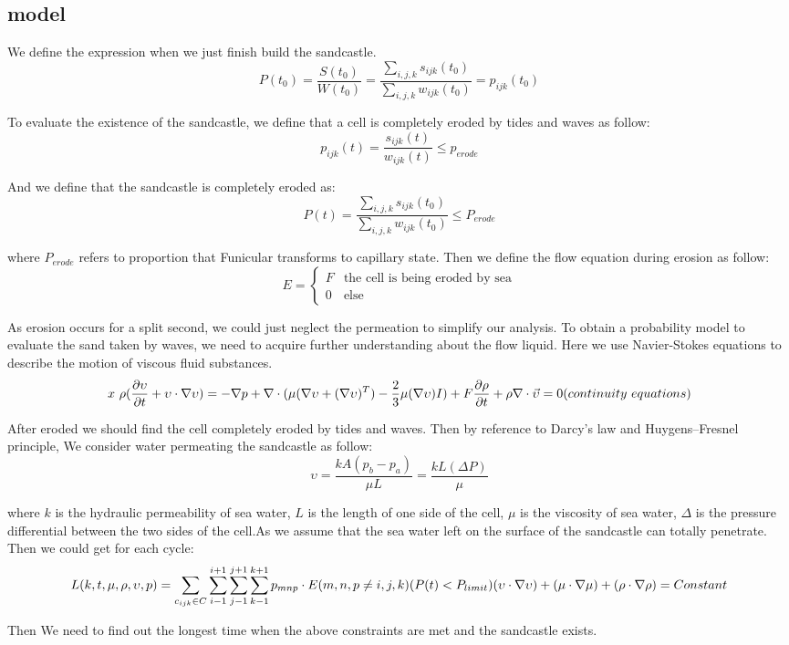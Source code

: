 \documentclass[12pt]{article}
\begin{document}
\subsection{model}
We define the expression when we just finish build the sandcastle.
$$  P(t_0) = \frac{S(t_0)}{W(t_0)} = \frac{\sum_{i,j,k}s_{ijk}(t_0)}{\sum_{i,j,k}w_{ijk}(t_0)} = p_{ijk}(t_0) $$
\par
To evaluate the existence of the sandcastle, we define that a cell is completely eroded by tides and waves as follow:
$$  p_{ijk}(t) = \frac{s_{ijk}(t)}{w_{ijk}(t)} \leq p_{erode} $$
\par
And we define that the sandcastle is completely eroded as:
$$  P(t) = \frac{\sum_{i,j,k}s_{ijk}(t_0)}{\sum_{i,j,k}w_{ijk}(t_0)} \leq P_{erode} $$
\par
where $P_{erode}$ refers to proportion that Funicular transforms to capillary state. Then we define the flow equation during erosion as follow:
$$	E= 	
\begin{cases}
	F& \text{the cell is being eroded by sea}\\
	0& \text{else}
\end{cases}
$$
\par
As erosion occurs for a split second, we could just neglect the permeation to simplify our analysis. To obtain a probability model to evaluate the sand taken by waves, we need to acquire further understanding about the flow liquid. Here we use Navier-Stokes equations to describe the motion of viscous fluid substances. 
$$
x \rho(\frac{\partial \upsilon}{\partial t} + \upsilon \cdot \nabla \upsilon) = -\nabla p + \nabla \cdot(\mu(\nabla \upsilon+(\nabla \upsilon)^T)-\frac{2}{3}\mu(\nabla \upsilon)I)+F\\\frac{\partial \rho}{\partial t}+\rho\nabla\cdot\vec{\upsilon}=0(continuity \ equations)                    
$$
\par
After eroded we should find the cell completely eroded by tides and waves. Then by reference to Darcy's law and Huygens–Fresnel principle, We consider water permeating the sandcastle as follow:
$$
\upsilon=\frac{kA(p_b-p_a)}{\mu L}=\frac{kL(\Delta P)}{\mu}
$$
\par
where $k$ is the hydraulic permeability of sea water, $L$ is the length of one side of the cell, $\mu$ is the viscosity of sea water, $\Delta$ is the pressure differential between the two sides of the cell.As we assume that the sea water left on the surface of the sandcastle can totally penetrate. Then we could get for each cycle:
$$
L (k,t,\mu,\rho,\upsilon,p)=\sum_{c_{ijk}\in C}\sum_{i-1}^{i+1}\sum_{j-1}^{j+1}\sum_{k-1}^{k+1}{p_{mnp}\cdot E}(m,n,p \neq i,j,k)(P(t) <P_{limit})\\
(\upsilon \cdot \nabla \upsilon)+(\mu \cdot \nabla \mu)+(\rho \cdot \nabla \rho) = Constant
$$
\par
Then We need to find out the longest time when the above constraints are met and the sandcastle exists.
\end{document}
